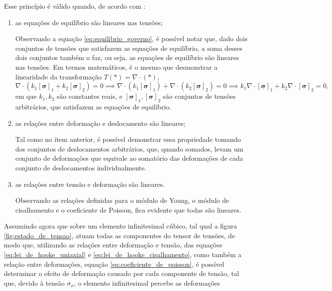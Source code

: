 Esse princípio é válido quando, de acordo com \cite{lub}:
\begin{enumerate}
    \item as equações de equilíbrio são lineares nas tensões;
        
    Observando a equação \ref{eq:equilibrio_governo}, é possível notar que, dado dois conjuntos de tensões que satisfazem as equações de equilíbrio, a soma desses dois conjuntos também o faz, ou seja, as equações de equilíbrio são lineares nas tensões. Em termos matemáticos, é o mesmo que desmonstrar a linearidade da transformação $T(*) = \nabla \cdot (*)$,
        \begin{equation}
            \nabla \cdot (k_1 [\bm{\sigma}]_1 + k_2 [\bm{\sigma}]_2) = 0 \implies \nabla \cdot (k_1 [ \bm{\sigma}]_1) + \nabla \cdot (k_2[\bm{\sigma}]_2) = 0 \implies  k_1 \nabla \cdot [\bm{\sigma}]_1 + k_2 \nabla \cdot [\bm{\sigma}]_2 = 0,
        \end{equation}
        em que $k_1, k_2$ são constantes reais, e $[\bm{\sigma}]_1, [\bm{\sigma}]_2$ são conjuntos de tensões arbitrários, que satisfazem as equações de equilíbrio. 
    \item as relações entre deformação e deslocamento são lineares;
        
    Tal como no item anterior, é possível demonstrar essa propriedade tomando dos conjuntos de deslocamentos arbitrários, que, quando somados, levam um conjunto de deformações que equivale ao somatório das deformações de cada conjunto de deslocamentos individualmente.
    \item as relações entre tensão e deformação são lineares.
        
    Observando as relações definidas para o módulo de Young, o módulo de cisalhamento e o coeficiente de Poisson, fica evidente que todas são lineares.
\end{enumerate}

Assumindo agora que sobre um elemento infinitesimal cúbico, tal qual a figura \ref{fig:estado_de_tensao}, atuam todas as componentes do tensor de tensões, de modo que, utilizando as relações entre deformação e tensão, das equações \ref{eq:lei_de_hooke_uniaxial} e \ref{eq:lei_de_hooke_cisalhamento}, como também a relação entre deformações, equação \ref{eq:coeficiente_de_poisson}, é possível determinar o efeito de deformação causado por cada componente de tensão, tal que, devido à tensão $\sigma_x$, o elemento infinitesimal percebe as deformações


